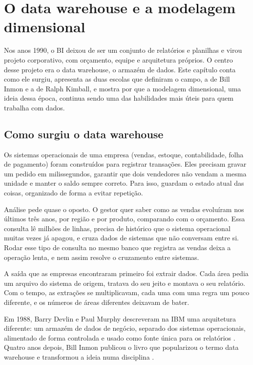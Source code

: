 \chapter{O data warehouse e a modelagem dimensional}
\label{cap:dw}

Nos anos 1990, o BI deixou de ser um conjunto de relatórios e planilhas e virou projeto
corporativo, com orçamento, equipe e arquitetura próprios. O centro desse projeto era o
data warehouse, o armazém de dados. Este capítulo conta como ele surgiu, apresenta as
duas escolas que definiram o campo, a de Bill Inmon e a de Ralph Kimball, e mostra por
que a modelagem dimensional, uma ideia dessa época, continua sendo uma das habilidades
mais úteis para quem trabalha com dados.

\section{Como surgiu o data warehouse}
\label{sec:surgimento-dw}

Os sistemas operacionais de uma empresa (vendas, estoque, contabilidade, folha de
pagamento) foram construídos para registrar transações. Eles precisam gravar um pedido
em milissegundos, garantir que dois vendedores não vendam a mesma unidade e manter o
saldo sempre correto. Para isso, guardam o estado atual das coisas, organizado de forma
a evitar repetição.

Análise pede quase o oposto. O gestor quer saber como as vendas evoluíram nos últimos
três anos, por região e por produto, comparando com o orçamento. Essa consulta lê
milhões de linhas, precisa de histórico que o sistema operacional muitas vezes já
apagou, e cruza dados de sistemas que não conversam entre si. Rodar esse tipo de
consulta no mesmo banco que registra as vendas deixa a operação lenta, e nem assim
resolve o cruzamento entre sistemas.

A saída que as empresas encontraram primeiro foi extrair dados. Cada área pedia um
arquivo do sistema de origem, tratava do seu jeito e montava o seu relatório. Com o
tempo, as extrações se multiplicavam, cada uma com uma regra um pouco diferente, e os
números de áreas diferentes deixavam de bater. 

Em 1988, Barry Devlin e Paul Murphy descreveram na IBM uma arquitetura diferente: um
armazém de dados de negócio, separado dos sistemas operacionais, alimentado de forma
controlada e usado como fonte única para os relatórios \parencite{devlin1988}. Quatro
anos depois, Bill Inmon publicou o livro que popularizou o termo data warehouse e
transformou a ideia numa disciplina \parencite{inmon1992}.

